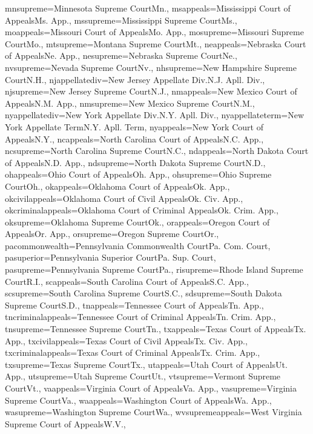 {mnsupreme={{Minnesota Supreme Court}{Mn.}},
msappeals={{Mississippi Court of Appeals}{Ms.  App.}},
mssupreme={{Mississippi Supreme Court}{Ms.}},
moappeals={{Missouri Court of Appeals}{Mo.  App.}},
mosupreme={{Missouri Supreme Court}{Mo.}},
mtsupreme={{Montana Supreme Court}{Mt.}},
neappeals={{Nebraska Court of Appeals}{Ne.  App.}},
nesupreme={{Nebraska Supreme Court}{Ne.}},
nvsupreme={{Nevada Supreme Court}{Nv.}},
nhsupreme={{New Hampshire Supreme Court}{N.H.}},
njappellatediv={{New Jersey Appellate Div.}{N.J. Apll. Div.}},
njsupreme={{New Jersey Supreme Court}{N.J.}},
nmappeals={{New Mexico Court of Appeals}{N.M.  App.}},
nmsupreme={{New Mexico Supreme Court}{N.M.}},
nyappellatediv={{New York Appellate Div.}{N.Y. Apll. Div.}},
nyappellateterm={{New York Appellate Term}{N.Y. Apll. Term}},
nyappeals={{New York Court of Appeals}{N.Y.}},
ncappeals={{North Carolina Court of Appeals}{N.C.  App.}},
ncsupreme={{North Carolina Supreme Court}{N.C.}},
ndappeals={{North Dakota Court of Appeals}{N.D.  App.}},
ndsupreme={{North Dakota Supreme Court}{N.D.}},
ohappeals={{Ohio Court of Appeals}{Oh.  App.}},
ohsupreme={{Ohio Supreme Court}{Oh.}},
okappeals={{Oklahoma Court of Appeals}{Ok.  App.}},
okcivilappeals={{Oklahoma Court of Civil Appeals}{Ok.  Civ. App.}},
okcriminalappeals={{Oklahoma Court of Criminal Appeals}{Ok.  Crim. App.}},
oksupreme={{Oklahoma Supreme Court}{Ok.}},
orappeals={{Oregon Court of Appeals}{Or.  App.}},
orsupreme={{Oregon Supreme Court}{Or.}},
pacommonwealth={{Pennsylvania Commonwealth Court}{Pa. Com. Court}},
pasuperior={{Pennsylvania Superior Court}{Pa. Sup. Court}},
pasupreme={{Pennsylvania Supreme Court}{Pa.}},
risupreme={{Rhode Island Supreme Court}{R.I.}},
scappeals={{South Carolina Court of Appeals}{S.C.  App.}},
scsupreme={{South Carolina Supreme Court}{S.C.}},
sdsupreme={{South Dakota Supreme Court}{S.D.}},
tnappeals={{Tennessee Court of Appeals}{Tn.  App.}},
tncriminalappeals={{Tennessee Court of Criminal Appeals}{Tn.  Crim. App.}},
tnsupreme={{Tennessee Supreme Court}{Tn.}},
txappeals={{Texas Court of Appeals}{Tx.  App.}},
txcivilappeals={{Texas Court of Civil Appeals}{Tx.  Civ. App.}},
txcriminalappeals={{Texas Court of Criminal Appeals}{Tx.  Crim. App.}},
txsupreme={{Texas Supreme Court}{Tx.}},
utappeals={{Utah Court of Appeals}{Ut.  App.}},
utsupreme={{Utah Supreme Court}{Ut.}},
vtsupreme={{Vermont Supreme Court}{Vt.}},
vaappeals={{Virginia Court of Appeals}{Va.  App.}},
vasupreme={{Virginia Supreme Court}{Va.}},
waappeals={{Washington Court of Appeals}{Wa.  App.}},
wasupreme={{Washington Supreme Court}{Wa.}},
wvsupremeappeals={{West Virginia Supreme Court of Appeals}{W.V.}},
}
